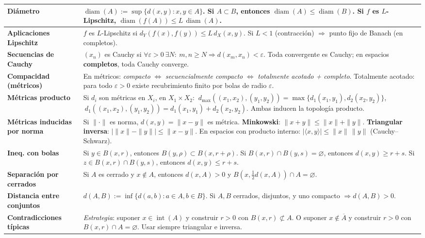 \documentclass[12pt]{article}
\begin{document}
\begin{tabular}{|L{4.3cm}|L{11.5cm}|}
\textbf{Diámetro} &
\(\operatorname{diam}(A):=\sup\{d(x,y):x,y\in A\}\).
\; Si \(A\subset B\), entonces \(\operatorname{diam}(A)\le \operatorname{diam}(B)\).
\; Si \(f\) es \(L\)-Lipschitz, \(\operatorname{diam}(f(A))\le L\,\operatorname{diam}(A)\).
\\
\hline

\textbf{Aplicaciones Lipschitz} &
\(f\) es \(L\)-Lipschitz si \(d_Y(f(x),f(y))\le L\,d_X(x,y)\).
\; Si \(L<1\) (contracción) \(\Rightarrow\) punto fijo de Banach (en completos).
\\
\hline

\textbf{Secuencias de Cauchy} &
\((x_n)\) es Cauchy si \(\forall\varepsilon>0\ \exists N:\ m,n\ge N\Rightarrow d(x_m,x_n)<\varepsilon\).
\; Toda convergente es Cauchy; en espacios \textbf{completos}, toda Cauchy converge.
\\
\hline

\textbf{Compacidad (métricos)} &
En métricos: \textit{compacto} \(\Leftrightarrow\) \textit{secuencialmente compacto} \(\Leftrightarrow\) \textit{totalmente acotado + completo}.
\; Totalmente acotado: para todo \(\varepsilon>0\) existe recubrimiento finito por bolas de radio \(\varepsilon\).
\\
\hline

\textbf{Métricas producto} &
Si \(d_i\) son métricas en \(X_i\), en \(X_1\times X_2\):
\(\ d_{\max}((x_1,x_2),(y_1,y_2))=\max\{d_1(x_1,y_1),d_2(x_2,y_2)\}\),
\(\ d_{1}((x_1,x_2),(y_1,y_2))= d_1(x_1,y_1)+d_2(x_2,y_2)\).
\; Ambas inducen la topología producto.
\\
\hline

\textbf{Métricas inducidas por norma} &
Si \(\|\cdot\|\) es norma, \(d(x,y)=\|x-y\|\) es métrica.
\; \textbf{Minkowski}: \(\|x+y\|\le \|x\|+\|y\|\).
\; \textbf{Triangular inversa}: \(\lvert\|x\|-\|y\|\rvert\le \|x-y\|\).
\; En espacios con producto interno: \(\lvert\langle x,y\rangle\rvert\le \|x\|\,\|y\|\) (Cauchy–Schwarz).
\\
\hline

\textbf{Ineq. con bolas} &
Si \(y\in B(x,r)\), entonces \(B(y,\rho)\subset B(x,r+\rho)\).
\; Si \(B(x,r)\cap B(y,s)=\varnothing\), entonces \(d(x,y)\ge r+s\).
\; Si \(z\in B(x,r)\cap B(y,s)\), entonces \(d(x,y)\le r+s\).
\\
\hline

\textbf{Separación por cerrados} &
Si \(A\) es cerrado y \(x\notin A\), entonces \(d(x,A)>0\) y
\(B(x,\tfrac12 d(x,A))\cap A=\varnothing\).
\\
\hline

\textbf{Distancia entre conjuntos} &
\(d(A,B):=\inf\{d(a,b):a\in A,b\in B\}\).
\; Si \(A,B\) cerrados, disjuntos, y uno compacto \(\Rightarrow d(A,B)>0\).
\\
\hline

\textbf{Contradicciones típicas} &
\textit{Estrategia}: suponer \(x\in \operatorname{int}(A)\) y construir \(r>0\) con \(B(x,r)\not\subset A\).
\; O suponer \(x\notin\overline{A}\) y construir \(r>0\) con \(B(x,r)\cap A=\varnothing\).
\; Usar siempre triangular e inversa.
\\
\hline
\end{tabular}
\end{document}
